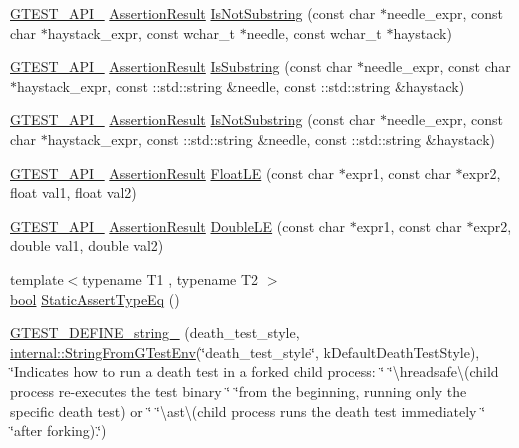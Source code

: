 \begin{DoxyCompactItemize}
\item 
\hyperlink{gtest-port_8h_aa73be6f0ba4a7456180a94904ce17790}{G\+T\+E\+S\+T\+\_\+\+A\+P\+I\+\_\+} \hyperlink{classtesting_1_1AssertionResult}{Assertion\+Result} \hyperlink{namespacetesting_a53e5c6e91ea429c43de7f4f57e33d166}{Is\+Not\+Substring} (const char $\ast$needle\+\_\+expr, const char $\ast$haystack\+\_\+expr, const wchar\+\_\+t $\ast$needle, const wchar\+\_\+t $\ast$haystack)
\item 
\hyperlink{gtest-port_8h_aa73be6f0ba4a7456180a94904ce17790}{G\+T\+E\+S\+T\+\_\+\+A\+P\+I\+\_\+} \hyperlink{classtesting_1_1AssertionResult}{Assertion\+Result} \hyperlink{namespacetesting_a571c7edcfc574269833ebe3e7d338ec5}{Is\+Substring} (const char $\ast$needle\+\_\+expr, const char $\ast$haystack\+\_\+expr, const \+::std\+::string \&needle, const \+::std\+::string \&haystack)
\item 
\hyperlink{gtest-port_8h_aa73be6f0ba4a7456180a94904ce17790}{G\+T\+E\+S\+T\+\_\+\+A\+P\+I\+\_\+} \hyperlink{classtesting_1_1AssertionResult}{Assertion\+Result} \hyperlink{namespacetesting_abe7b3fa1c9528745f934d4a14155ea87}{Is\+Not\+Substring} (const char $\ast$needle\+\_\+expr, const char $\ast$haystack\+\_\+expr, const \+::std\+::string \&needle, const \+::std\+::string \&haystack)
\item 
\hyperlink{gtest-port_8h_aa73be6f0ba4a7456180a94904ce17790}{G\+T\+E\+S\+T\+\_\+\+A\+P\+I\+\_\+} \hyperlink{classtesting_1_1AssertionResult}{Assertion\+Result} \hyperlink{namespacetesting_a2c9a2a391c72a7b02ea3024586e33af0}{Float\+LE} (const char $\ast$expr1, const char $\ast$expr2, float val1, float val2)
\item 
\hyperlink{gtest-port_8h_aa73be6f0ba4a7456180a94904ce17790}{G\+T\+E\+S\+T\+\_\+\+A\+P\+I\+\_\+} \hyperlink{classtesting_1_1AssertionResult}{Assertion\+Result} \hyperlink{namespacetesting_ae10e2bb304b74abd1b06a2d912a8b43b}{Double\+LE} (const char $\ast$expr1, const char $\ast$expr2, double val1, double val2)
\item 
{\footnotesize template$<$typename T1 , typename T2 $>$ }\\\hyperlink{classbool}{bool} \hyperlink{namespacetesting_a661e70fc6afeb5c085eed3716aa45059}{Static\+Assert\+Type\+Eq} ()
\item 
\hyperlink{namespacetesting_a8e954ed3f0f6ca2e90b043e419c74123}{G\+T\+E\+S\+T\+\_\+\+D\+E\+F\+I\+N\+E\+\_\+string\+\_\+} (death\+\_\+test\+\_\+style, \hyperlink{namespacetesting_1_1internal_ac54dabc540bf79c2de91add679bfb93b}{internal\+::\+String\+From\+G\+Test\+Env}(\char`\"{}death\+\_\+test\+\_\+style\char`\"{}, k\+Default\+Death\+Test\+Style), \char`\"{}Indicates how to run a death test in a forked child process\+: \char`\"{} \char`\"{}\textbackslash{}hreadsafe\textbackslash{}(child process re-\/executes the test binary \char`\"{} \char`\"{}from the beginning, running only the specific death test) or \char`\"{} \char`\"{}\textbackslash{}ast\textbackslash{}(child process runs the death test immediately \char`\"{} \char`\"{}after forking).\char`\"{})

\end{DoxyCompactItemize}

